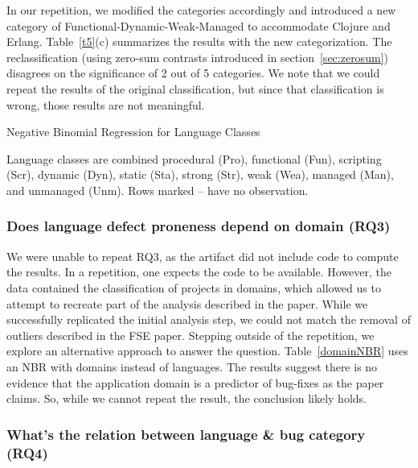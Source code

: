 \documentclass[acmsmall]{acmart}
\newcommand{\clojure}{{\sf  Clojure}\xspace}
\newcommand{\erlang}{{\sf  Erlang}\xspace}
\newcommand{\tabledesc}[1]{\begin{spacing}{.5}{\footnotesize #1}\end{spacing}}
\begin{document}
In our repetition, we modified the categories accordingly and introduced a
new category of {Functional-Dynamic-Weak-Managed} to accommodate \clojure
and \erlang. Table~\ref{t5}(c) summarizes the results with the new
categorization. The reclassification (using zero-sum contrasts introduced in
section~\ref{sec:zerosum}) disagrees on the significance of 2 out of 5
categories.  We note that we could repeat the results of the original
classification, but since that classification is wrong, those results are not
meaningful.


\begin{table}[h!]\center
\caption{Negative Binomial Regression for Language Classes}
\label{t5}
\medskip \tabledesc{Language classes are combined procedural (Pro),
  functional (Fun), scripting (Scr), dynamic (Dyn), static (Sta), strong
  (Str), weak (Wea), managed (Man), and unmanaged (Unm). Rows marked -- have
  no observation.}
\end{table}

\subsubsection{Does language defect proneness depend on domain (RQ3)}

We were unable to repeat RQ3, as the artifact did not include code to
compute the results. 
In a repetition, one expects the code to be available.
However, the data contained the classification of
projects in domains, which allowed us to attempt to recreate part of the
analysis described in the paper.  While we successfully replicated the
initial analysis step, we could not match the removal of outliers described
in the FSE paper.  Stepping outside of the repetition, we explore an
alternative approach to answer the question.  Table~\ref{domainNBR} uses an
NBR with domains instead of languages. The results suggest there is no
evidence that the application domain is a predictor of bug-fixes as the
paper claims.  So, while we cannot repeat the result, the conclusion
likely holds.


\subsubsection{ What's the relation between language \& bug category (RQ4)}
\end{document}
